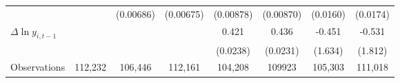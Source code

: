 {\begin{tabular}{l*{7}{c}}
          &                  &(0.00686)         &(0.00675)         &(0.00878)         &(0.00870)         & (0.0160)         & (0.0174)         \\
[1em]
$\Delta \ln y_{i,t-1}$&                  &                  &                  &    0.421\sym{***}&    0.436\sym{***}&   -0.451         &   -0.531         \\
          &                  &                  &                  & (0.0238)         & (0.0231)         &  (1.634)         &  (1.812)         \\
\hline
Observations&   112,232         &   106,446         &   112,161         &   104,208         &   109923         &   105,303         &   111,018         \\
\hline\hline
\end{tabular}
}
